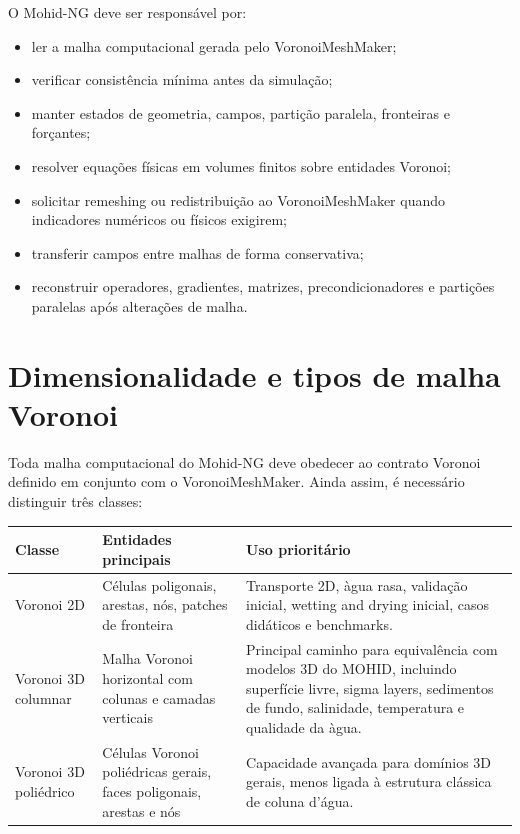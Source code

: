 \documentclass[11pt,a4paper]{article}
\begin{document}
O Mohid-NG deve ser respons\'avel por:
\begin{itemize}
  \item ler a malha computacional gerada pelo VoronoiMeshMaker;
  \item verificar consist\^encia m\'inima antes da simula\c{c}\~ao;
  \item manter estados de geometria, campos, parti\c{c}\~ao paralela, fronteiras e for\c{c}antes;
  \item resolver equa\c{c}\~oes f\'isicas em volumes finitos sobre entidades Voronoi;
  \item solicitar remeshing ou redistribui\c{c}\~ao ao VoronoiMeshMaker quando indicadores num\'ericos ou f\'isicos exigirem;
  \item transferir campos entre malhas de forma conservativa;
  \item reconstruir operadores, gradientes, matrizes, precondicionadores e parti\c{c}\~oes paralelas ap\'os altera\c{c}\~oes de malha.
\end{itemize}

\section{Dimensionalidade e tipos de malha Voronoi}

Toda malha computacional do Mohid-NG deve obedecer ao contrato Voronoi definido em conjunto com o VoronoiMeshMaker. Ainda assim, \'e necess\'ario distinguir tr\^es classes:

\begin{longtable}{p{}p{}p{}}
\toprule
\textbf{Classe} & \textbf{Entidades principais} & \textbf{Uso priorit\'ario}\tabularnewline
\midrule
Voronoi 2D & C\'elulas poligonais, arestas, n\'os, patches de fronteira & Transporte 2D, \`agua rasa, valida\c{c}\~ao inicial, wetting and drying inicial, casos did\'aticos e benchmarks.\tabularnewline
\addlinespace
Voronoi 3D columnar & Malha Voronoi horizontal com colunas e camadas verticais & Principal caminho para equival\^encia com modelos 3D do MOHID, incluindo superf\'icie livre, sigma layers, sedimentos de fundo, salinidade, temperatura e qualidade da \`agua.\tabularnewline
\addlinespace
Voronoi 3D poli\'edrico & C\'elulas Voronoi poli\'edricas gerais, faces poligonais, arestas e n\'os & Capacidade avan\c{c}ada para dom\'inios 3D gerais, menos ligada \`a estrutura cl\'assica de coluna d'\'agua.\tabularnewline
\bottomrule
\end{longtable}
\end{document}

